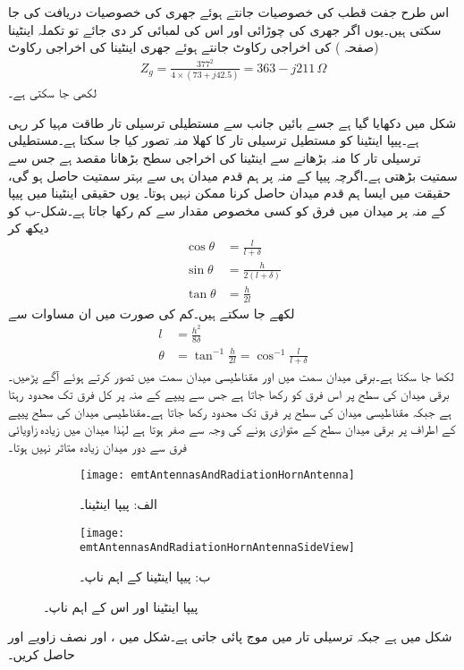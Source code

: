 اس طرح جفت قطب کی خصوصیات جانتے ہوئے جھری کی خصوصیات دریافت کی جا سکتی ہیں۔یوں اگر جھری کی چوڑائی  اور اس کی لمبائی  کر دی جائے تو تکملہ اینٹینا (صفحہ ) کی اخراجی رکاوٹ   جانتے ہوئے جھری اینٹینا کی اخراجی رکاوٹ
\begin{align}
Z_g=\frac{377^2}{4 \times (73+j42.5)}=363-j 211 \, \Omega
\end{align}
لکھی جا سکتی ہے۔

شکل  میں  دکھایا گیا ہے جسے بائیں جانب سے مستطیلی ترسیلی تار طاقت مہیا کر رہی ہے۔پیپا اینٹینا کو مستطیل ترسیلی تار کا کھلا منہ تصور کیا جا سکتا ہے۔مستطیلی ترسیلی تار کا منہ بڑھانے سے اینٹینا کی اخراجی سطح بڑھانا مقصد ہے جس سے سمتیت بڑھتی ہے۔اگرچہ پیپا کے منہ پر ہم قدم میدان ہی سے بہتر سمتیت حاصل ہو گی، حقیقت میں ایسا ہم قدم میدان حاصل کرنا ممکن نہیں ہوتا۔ یوں حقیقی اینٹینا میں پیپا کے منہ پر میدان میں فرق کو کسی مخصوص مقدار  سے کم رکھا جاتا ہے۔شکل-ب کو دیکھ کر
  \begin{align*}
\cos \theta&=\frac{l}{l+\delta}\\
\sin \theta&=\frac{h}{2(l+\delta)}\\
\tan \theta&=\frac{h}{2l}
\end{align*}
لکھے جا سکتے ہیں۔کم  کی صورت میں ان مساوات سے
\begin{align}
l&=\frac{h^2}{8 \delta}\\
\theta&=\tan^{-1} \frac{h}{2l}=\cos^{-1}\frac{l}{l+\delta}
\end{align}
لکھا جا سکتا ہے۔برقی میدان  سمت میں اور مقناطیسی میدان  سمت میں تصور کرتے ہوئے آگے پڑھیں۔برقی میدان  کی سطح پر اس فرق کو  رکھا جاتا ہے جس سے پیپے کے منہ پر کل فرق  تک محدود رہتا ہے جبکہ مقناطیسی میدان  کی سطح  پر فرق  تک محدود رکھا جاتا ہے۔مقناطیسی میدان کی سطح پیپے کے اطراف پر برقی میدان سطح کے متوازی ہونے کی وجہ سے صفر ہوتا ہے لہٰذا میدان میں زیادہ زاویائی فرق سے دور میدان زیادہ متاثر نہیں ہوتا۔

\begin{figure}
\centering
\begin{subfigure}{0.5\textwidth}
\centering
\texttt{[image: emtAntennasAndRadiationHornAntenna]}
\caption*{الف: پیپا اینٹینا۔}
\end{subfigure}%
%
\begin{subfigure}{0.5\textwidth}
\centering
\texttt{[image: emtAntennasAndRadiationHornAntennaSideView]}
\caption*{ب: پیپا اینٹینا کے اہم ناپ۔}
\end{subfigure}%
\caption{پیپا اینٹینا اور اس کے اہم ناپ۔}
\label{شکل_اینٹینا_پیپا_اینٹینا}
\end{figure}
شکل میں  ہے جبکہ ترسیلی تار میں  موج پائی جاتی ہے۔شکل میں ،  اور نصف زاویے  اور  حاصل کریں۔

